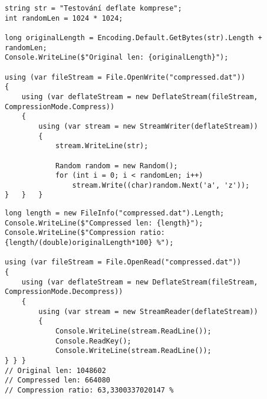 \begin{frame}[fragile]
\begin{yesblock}
\begin{lstlisting}
string str = "Testování deflate komprese";
int randomLen = 1024 * 1024;

long originalLength = Encoding.Default.GetBytes(str).Length + randomLen;
Console.WriteLine($"Original len: {originalLength}");

using (var fileStream = File.OpenWrite("compressed.dat"))
{
    using (var deflateStream = new DeflateStream(fileStream, CompressionMode.Compress))
    {
        using (var stream = new StreamWriter(deflateStream))
        {
            stream.WriteLine(str);

            Random random = new Random();
            for (int i = 0; i < randomLen; i++)
                stream.Write((char)random.Next('a', 'z'));
}   }   }
\end{lstlisting}
\end{yesblock}
\end{frame}


\begin{frame}[fragile]
\begin{yesblock}
\begin{lstlisting}
long length = new FileInfo("compressed.dat").Length;
Console.WriteLine($"Compressed len: {length}");
Console.WriteLine($"Compression ratio: {length/(double)originalLength*100} %");

using (var fileStream = File.OpenRead("compressed.dat"))
{
    using (var deflateStream = new DeflateStream(fileStream, CompressionMode.Decompress))
    {
        using (var stream = new StreamReader(deflateStream))
        {
            Console.WriteLine(stream.ReadLine());
            Console.ReadKey();
            Console.WriteLine(stream.ReadLine());
} } }
// Original len: 1048602
// Compressed len: 664080
// Compression ratio: 63,3300337020147 %
\end{lstlisting}
\end{yesblock}
\end{frame}










